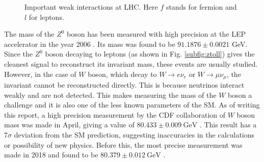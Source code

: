 \documentclass[a4paper]{report}
\numberwithin{equation}{section}
\begin{document}
\begin{figure}[htb!]
	\centering
	\quad
	\centering
	\quad
	\centering
	\caption{Important weak interactions at LHC. Here $f$ stands for fermion and $l$ for leptons.}
	\label{fig:weak_int}
\end{figure}

The mass of the $Z^0$ boson has been measured with high precision at the LEP accelerator in the year 2006 \cite{ALEPH:2005ab}. Its mass was found to be $91.1876 \pm 0.0021$ GeV. Since the $Z^0$ boson decaying to leptons (as shown in Fig. \ref{subfig:ztoll}) gives the cleanest signal to reconstruct its invariant mass, these events are usually studied. However, in the case of $W$ boson, which decay to $W \rightarrow e\nu_e$ or $W \rightarrow \mu \nu_{\mu}$, the invariant cannot be reconstructed directly. This is because neutrinos interact weakly and are not detected. This makes measuring the mass of the $W$ boson a challenge and it is also one of the less known parameters of the SM. As of writing this report, a high precision measurement by the CDF collaboration of $W$ boson mass was made in April, giving a value of $80.433 \pm 0.009 \ \text{GeV}$ \cite{CDF:2022hxs}. This result has a 7$\sigma$ deviation from the SM prediction, suggesting inaccuracies in the calculations or possibility of new physics. Before this, the most precise measurement was made in 2018 and found to be $80.379 \pm 0.012 \ \text{GeV}$ \cite{PhysRevD.98.030001}. 
\end{document}
